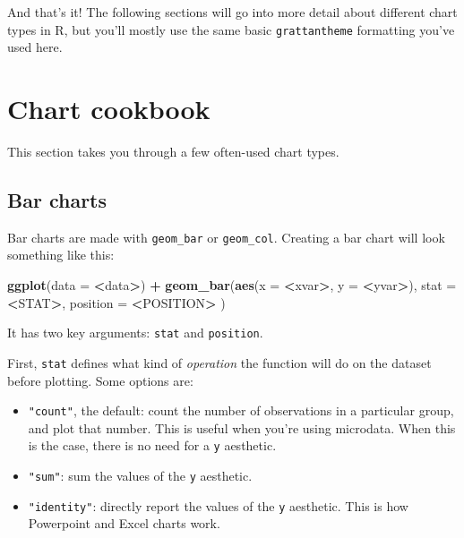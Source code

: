 \documentclass[]{book}
\newenvironment{Shaded}{\begin{snugshade}}{\end{snugshade}}
\newcommand{\DataTypeTok}[1]{\textcolor[rgb]{0.13,0.29,0.53}{#1}}
\newcommand{\KeywordTok}[1]{\textcolor[rgb]{0.13,0.29,0.53}{\textbf{#1}}}
\newcommand{\NormalTok}[1]{#1}
\newcommand{\OperatorTok}[1]{\textcolor[rgb]{0.81,0.36,0.00}{\textbf{#1}}}
\newcommand{\StringTok}[1]{\textcolor[rgb]{0.31,0.60,0.02}{#1}}
\providecommand{\tightlist}{%
  \setlength{\itemsep}{0pt}\setlength{\parskip}{0pt}}
\begin{document}
And that's it! The following sections will go into more detail about different chart types in R, but you'll mostly use the same basic \texttt{grattantheme} formatting you've used here.

\hypertarget{chart-cookbook}{%
\section{Chart cookbook}\label{chart-cookbook}}

This section takes you through a few often-used chart types.

\hypertarget{bar-charts}{%
\subsection{Bar charts}\label{bar-charts}}

Bar charts are made with \texttt{geom\_bar} or \texttt{geom\_col}. Creating a bar chart will look something like this:

\begin{Shaded}
\begin{Highlighting}[]
\KeywordTok{ggplot}\NormalTok{(}\DataTypeTok{data =} \OperatorTok{<}\NormalTok{data}\OperatorTok{>}\NormalTok{) }\OperatorTok{+}\StringTok{ }
\StringTok{  }\KeywordTok{geom_bar}\NormalTok{(}\KeywordTok{aes}\NormalTok{(}\DataTypeTok{x =} \OperatorTok{<}\NormalTok{xvar}\OperatorTok{>}\NormalTok{, }\DataTypeTok{y =} \OperatorTok{<}\NormalTok{yvar}\OperatorTok{>}\NormalTok{),}
     \DataTypeTok{stat =} \OperatorTok{<}\NormalTok{STAT}\OperatorTok{>}\NormalTok{, }
     \DataTypeTok{position =} \OperatorTok{<}\NormalTok{POSITION}\OperatorTok{>}
\StringTok{  }\NormalTok{)}
\end{Highlighting}
\end{Shaded}

It has two key arguments: \texttt{stat} and \texttt{position}.

First, \texttt{stat} defines what kind of \emph{operation} the function will do on the dataset before plotting. Some options are:

\begin{itemize}
\tightlist
\item
  \texttt{"count"}, the default: count the number of observations in a particular group, and plot that number. This is useful when you're using microdata. When this is the case, there is no need for a \texttt{y} aesthetic.
\item
  \texttt{"sum"}: sum the values of the \texttt{y} aesthetic.
\item
  \texttt{"identity"}: directly report the values of the \texttt{y} aesthetic. This is how Powerpoint and Excel charts work.
\end{itemize}
\end{document}
